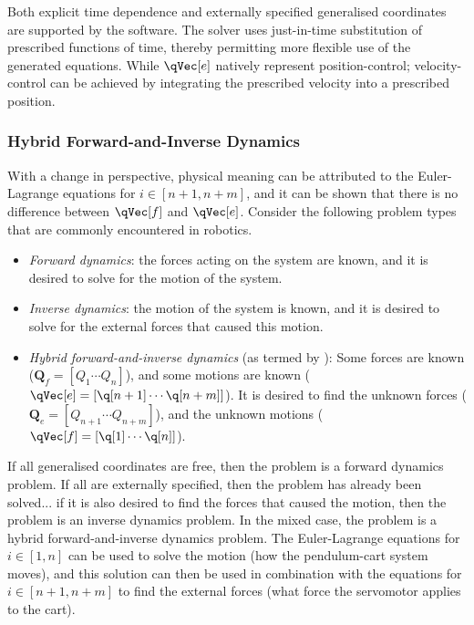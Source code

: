 \documentclass[11pt]{article}
\begin{document}
Both explicit time dependence and externally specified generalised coordinates are supported by the software. The solver uses just-in-time substitution of prescribed functions of time, thereby permitting more flexible use of the generated equations. While $\qVec[e]$ natively represent position-control; velocity-control can be achieved by integrating the prescribed velocity into a prescribed position.


\subsubsection{Hybrid Forward-and-Inverse Dynamics} \label{sssec:f:hybridDynamics}
With a change in perspective, physical meaning can be attributed to the Euler-Lagrange equations for $i\in[n+1,n+m]$, and it can be shown that there is no difference between $\qVec[f]$ and $\qVec[e]$. Consider the following problem types that are commonly encountered in robotics.
\begin{itemize}\setlength{\parskip}{0em}
    \item \emph{Forward dynamics}: the forces acting on the system are known, and it is desired to solve for the motion of the system.
    \item \emph{Inverse dynamics}: the motion of the system is known, and it is desired to solve for the external forces that caused this motion.
    \item \emph{Hybrid forward-and-inverse dynamics} (as termed by \cite{RFb-13}): Some forces are known ($\mathbf{Q}_f=[Q_{1} \cdots Q_{n}]$), and some motions are known ($\qVec[e]=[\q[n+1] \cdots \q[n+m]]$). It is desired to find the unknown forces ($\mathbf{Q}_e=[Q_{n+1} \cdots Q_{n+m}]$), and the unknown motions ($\qVec[f]=[\q[1] \cdots \q[n]]$).
\end{itemize}

If all generalised coordinates are free, then the problem is a forward dynamics problem. If all are externally specified, then the problem has already been solved... if it is also desired to find the forces that caused the motion, then the problem is an inverse dynamics problem. In the mixed case, the problem is a hybrid forward-and-inverse dynamics problem. The Euler-Lagrange equations for $i\in[1,n]$ can be used to solve the motion (how the pendulum-cart system moves), and this solution can then be used in combination with the equations for $i\in[n+1,n+m]$ to find the external forces (what force the servomotor applies to the cart).
\end{document}
